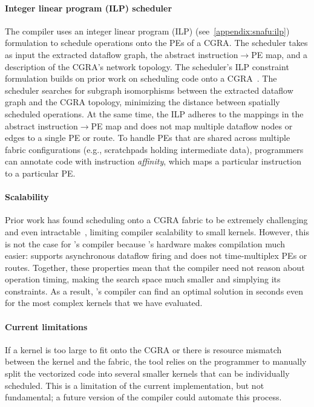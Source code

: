\paragraph{Integer linear program (ILP) scheduler}
The compiler uses an integer linear program (ILP) (see~\autoref{appendix:snafu:ilp}) formulation to schedule
operations onto the PEs of a CGRA.
% 
The scheduler takes as input the extracted dataflow graph, the abstract
instruction$\rightarrow$PE map, and a description of the CGRA's network 
topology.
% 
The scheduler's ILP constraint formulation builds on prior work on scheduling code onto a CGRA~\cite{nowatzki2013general}.
% 
The scheduler searches for subgraph isomorphisms between the extracted
dataflow graph and the CGRA topology, minimizing the distance between
spatially scheduled operations.
% 
At the same time, the ILP adheres to the mappings in the abstract
instruction$\rightarrow$PE map and does not map multiple dataflow nodes or
edges to a single PE or route.
%
To handle PEs that are shared across multiple fabric configurations
(e.g., scratchpads holding intermediate data), programmers can
annotate code with instruction {\em affinity}, which maps a
particular instruction to a particular PE.
 
\paragraph{Scalability}
Prior work has found scheduling onto a CGRA fabric to be
extremely challenging and even
intractable~\cite{dave2018ramp,kou2020taem,nowatzki2018hybrid,weng2020dsagen},
limiting compiler scalability to small kernels.
% 
However, this is not the case for \snafu's compiler because \snafu's
hardware makes compilation much easier:
%
\snafu supports asynchronous dataflow firing
and does not time-multiplex PEs or routes.
%
Together, these properties mean that the compiler need not reason
about operation timing, making the search space much smaller
and simplying its constraints.
% 
As a result, \snafu's compiler can find an optimal solution in seconds
even for the most complex kernels that we have evaluated.

\paragraph{Current limitations}
If a kernel is too large to fit onto the CGRA or there is resource mismatch between the kernel and the fabric, the tool relies on the programmer to manually split the vectorized code into several smaller kernels that can be individually scheduled.
% 
This is a limitation of the current implementation, but not fundamental;
a future version of the compiler could automate this process.
